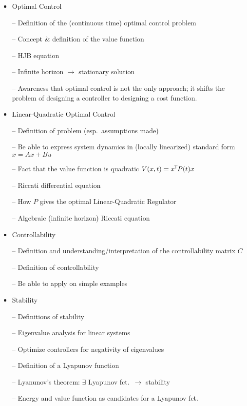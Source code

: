 \begin{itemize}
\item Optimal Control

-- Definition of the (continuous time) optimal control problem

-- Concept \& definition of the value function

-- HJB equation

-- Infinite horizon $\to$ stationary solution

-- Awareness that optimal control is not the only approach; it
  shifts the problem of designing a controller to designing
  a cost function.

\item Linear-Quadratic Optimal Control

-- Definition of problem (esp.\ assumptions made)

-- Be able to express system dynamics in (locally linearized)
standard form $\dot x=Ax+Bu$

-- Fact that the value function is quadratic $V(x,t) = x^{\!\top\!} P(t) x$

-- Riccati differential equation

-- How $P$ gives the optimal Linear-Quadratic Regulator

-- Algebraic (infinite horizon) Riccati equation

\item Controllability

-- Definition and understanding/interpretation of the controllability
matrix $C$

-- Definition of controllability

-- Be able to apply on simple examples

\item Stability

-- Definitions of stability

-- Eigenvalue analysis for linear systems

-- Optimize controllers for negativity of eigenvalues

-- Definition of a Lyapunov function

-- Lyanunov's theorem: $\exists$ Lyapunov fct.\ $\to$ stability

-- Energy and value function as candidates for a Lyapunov fct.

\end{itemize}


\clearpage
{}
\printindex




